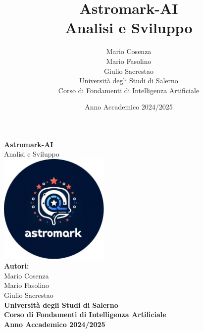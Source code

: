 \documentclass[a4paper,12pt]{report}
\title{\textbf{Astromark-AI}\\ \large Analisi e Sviluppo}
\author{Mario Cosenza \\ Mario Fasolino \\ Giulio Sacrestao \\ Università degli Studi di Salerno \\ Corso di Fondamenti di Intelligenza Artificiale}
\date{Anno Accademico 2024/2025}
\begin{document}
\begin{titlepage}
    \centering
    \vspace{2cm}
    \vfill
    {\Huge \textbf{Astromark-AI}}\\[1.5cm]
    {\Large Analisi e Sviluppo}\\[2cm]
    \includegraphics[width=0.4\textwidth]{images/astromarkLogo.jpg}\\[2cm]
    \textbf{Autori:}\\
    Mario Cosenza \\ Mario Fasolino \\ Giulio Sacrestao \\ \vspace{1cm}
    \textbf{Università degli Studi di Salerno}\\
    \textbf{Corso di Fondamenti di Intelligenza Artificiale}\\
    \vfill
    \textbf{Anno Accademico 2024/2025}
\end{titlepage}

\newpage

\pagestyle{fancy}
\fancyhf{}
\cfoot{\thepage}

\tableofcontents
\newpage











\appendix

\end{document}
